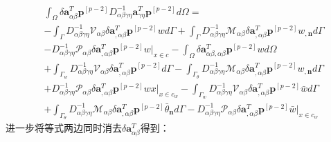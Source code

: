 \begin{equation}
\begin{split}
    &\int_{\Omega}\delta\pmb{a}_{\alpha\beta}^T\pmb{p}^{[p-2]}D^{-1}_{\alpha\beta\gamma\eta}\pmb{a}_{\gamma\eta}^T\pmb{p}^{[p-2]}d\Omega=\\
    &-\int_{\Gamma}D_{\alpha\beta\gamma\eta}^{-1}\mathcal{V}_{\alpha\beta}\delta\pmb{a}_{,\alpha\beta}^T\pmb{p}^{[p-2]}wd\Gamma
    +\int_{\Gamma}D_{\alpha\beta\gamma\eta}^{-1}\mathcal{M}_{\alpha\beta}\delta\pmb{a}_{,\alpha\beta}^T\pmb{p}^{[p-2]}w_{,\pmb{n}}d\Gamma\\
    &-D_{\alpha\beta\gamma\eta}^{-1}\mathcal{P}_{\alpha\beta}\delta\pmb{a}_{,\alpha\beta}^T\pmb{p}^{[p-2]}w\vert_{x\in c}
    -\int_{\Omega}\delta\pmb{a}_{\alpha\beta,\alpha\beta}^T\pmb{p}^{[p-2]}wd\Omega\\
    &+\int_{\Gamma_w}D_{\alpha\beta\gamma\eta}^{-1}\mathcal{V}_{\alpha\beta}\delta\pmb{a}_{,\alpha\beta}^T\pmb{p}^{[p-2]}d\Gamma
    -\int_{\Gamma_{\theta}}D_{\alpha\beta\gamma\eta}^{-1}\mathcal{M}_{\alpha\beta}\delta\pmb{a}_{,\alpha\beta}^T\pmb{p}^{[p-2]}w_{,\pmb{n}}d\Gamma\\
    &+D_{\alpha\beta\gamma\eta}^{-1}\mathcal{P}_{\alpha\beta}\delta\pmb{a}_{,\alpha\beta}^T\pmb{p}^{[p-2]}wx\vert_{x\in{c_w}}
    -\int_{\Gamma_w}D_{\alpha\beta\gamma\eta}^{-1}\mathcal{V}_{\alpha\beta}\delta\pmb{a}_{,\alpha\beta}^T\pmb{p}^{[p-2]}\bar{w}d\Gamma\\
    &+\int_{\Gamma_{\theta}}D_{\alpha\beta\gamma\eta}^{-1}\mathcal{M}_{\alpha\beta}\delta\pmb{a}_{,\alpha\beta}^T\pmb{p}^{[p-2]}\bar{\theta}_{\pmb{n}}d\Gamma
    -D_{\alpha\beta\gamma\eta}^{-1}\mathcal{P}_{\alpha\beta}\delta\pmb{a}_{,\alpha\beta}^T\pmb{p}^{[p-2]}\bar{w}\vert_{x\in{c_w}}
\end{split}
\end{equation}
进一步将等式两边同时消去$\delta\pmb{a}^T_{\alpha\beta}$得到：
